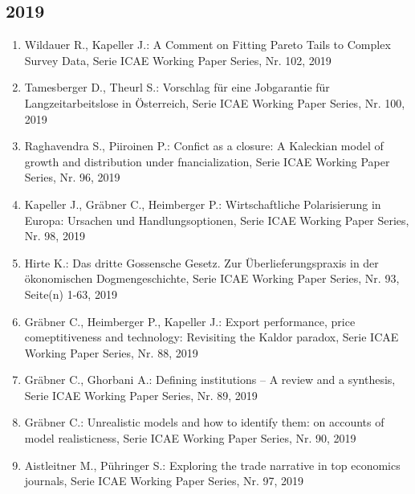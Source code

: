 \subsection*{2019}
\begin{enumerate}
    	 \item Wildauer R., Kapeller J.: A Comment on Fitting Pareto Tails to Complex Survey Data, Serie ICAE Working Paper Series, Nr. 102, 2019
	 \item Tamesberger D., Theurl S.: Vorschlag für eine Jobgarantie für Langzeitarbeitslose in Österreich, Serie ICAE Working Paper Series, Nr. 100, 2019
	 \item Raghavendra S., Piiroinen P.: Confict as a closure: A Kaleckian model of growth and distribution under fnancialization, Serie ICAE Working Paper Series, Nr. 96, 2019
	 \item Kapeller J., Gräbner C., Heimberger P.: Wirtschaftliche Polarisierung in Europa: Ursachen und Handlungsoptionen, Serie ICAE Working Paper Series, Nr. 98, 2019
	 \item Hirte K.: Das dritte Gossensche Gesetz. Zur Überlieferungspraxis in der ökonomischen Dogmengeschichte, Serie ICAE Working Paper Series, Nr. 93, Seite(n) 1-63, 2019
	 \item Gräbner C., Heimberger P., Kapeller J.: Export performance, price comeptitiveness and technology: Revisiting the Kaldor paradox, Serie ICAE Working Paper Series, Nr. 88, 2019
	 \item Gräbner C., Ghorbani A.: Defining institutions -- A review and a synthesis, Serie ICAE Working Paper Series, Nr. 89, 2019
	 \item Gräbner C.: Unrealistic models and how to identify them: on accounts of model realisticness, Serie ICAE Working Paper Series, Nr. 90, 2019
	 \item Aistleitner M., Pühringer S.: Exploring the trade narrative in top economics journals, Serie ICAE Working Paper Series, Nr. 97, 2019
\end{enumerate}
